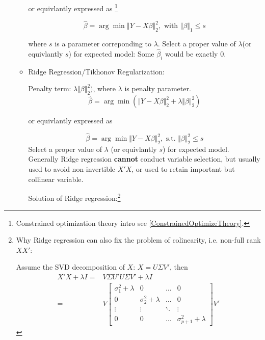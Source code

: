 \begin{itemize}[topsep=2pt,itemsep=0pt]
\begin{itemize}[topsep=2pt,itemsep=2pt]
    or equivlantly expressed as \footnote{Constrained optimization theory intro see \autoref{ConstrainedOptimizeTheory}.}

\begin{equation}
    \hat{\beta }=\arg\min \left\Vert Y-X\beta \right\Vert _2 ^2, \text{ with }\Vert \beta \Vert _1\leq s
\end{equation}

where $ s $ is a parameter correponding to $ \lambda  $. Select a proper value of $ \lambda  $(or equivlantly $ s $) for expected model: Some $ \hat{\beta }_i $ would be exactly $ 0 $.



\item Ridge Regression/Tikhonov Regularization:

Penalty term: $ \lambda\Vert \beta \Vert _2^2) $, where $ \lambda  $ is penalty parameter.
\begin{equation}
    \hat{\beta }=\arg\min (\Vert Y-X\beta \Vert _2 ^2+\lambda\Vert \beta \Vert _2^2)
\end{equation}

    or equivlantly expressed as 

\begin{equation}
    \hat{\beta }=\arg\min \Vert Y-X\beta \Vert _2 ^2, \text{ s.t. }\Vert \beta \Vert ^2_2\leq s
\end{equation}
Select a proper value of $ \lambda  $ (or equivlantly $ s $) for expected model. Generally Ridge regression \textbf{cannot} conduct variable selection, but usually used to avoid non-invertible $ X'X $, or used to retain important but collinear variable.

Solution of Ridge regression:\footnote{Why Ridge regression can also fix the problem of colinearity, i.e. non-full rank $ XX' $:

Assume the SVD decomposition of $ X $: $ X=U\Sigma V' $, then 
\begin{align*}
    X'X+\lambda I=&V\Sigma U'U\Sigma V'+\lambda I\\
    =& V \begin{bmatrix}
    \sigma^2 _{1}+\lambda &0&\ldots&0\\
    0&\sigma^2 _{2}+\lambda &\ldots&0\\
    \vdots&\vdots&\ddots&\vdots\\
    0&0&\ldots&\sigma^2 _{p+1}+\lambda 
    \end{bmatrix}V'
\end{align*}

}
\end{itemize}
\end{itemize}

